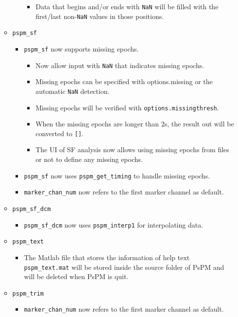 \documentclass[english]{article}
\numberwithin{equation}{section}
\numberwithin{figure}{section}
\begin{document}
\begin{itemize}
\begin{itemize}
\begin{itemize}
    		\begin{itemize}
    		\item Data that begins and/or ends with \texttt{NaN} will be filled with the first/last non-\texttt{NaN} values in those positions.
    		\end{itemize}
    	\end{itemize}
    	\item \texttt{pspm\_sf}
    	\begin{itemize}
    		\item \texttt{pspm\_sf} now supports missing epochs.
    		\begin{itemize}
    			\item Now allow input with \texttt{NaN} that indicates missing epochs. 
    			\item Missing epochs can be specified with options.missing or the automatic \texttt{NaN} detection. 
    			\item Missing epochs will be verified with \texttt{options.missingthresh}. 
    			\item When the missing epochs are longer than 2s, the result out will be converted to \texttt{[]}.
    			\item The UI of SF analysis now allows using missing epochs from files or not to define any missing epochs.
    		\end{itemize}
    		\item \texttt{pspm\_sf} now uses \texttt{pspm\_get\_timing} to handle missing epochs.
    		\item \texttt{marker\_chan\_num} now refers to the first marker channel as default.
    	\end{itemize}
    	\item \texttt{pspm\_sf\_dcm}
    	\begin{itemize}
    		\item \texttt{pspm\_sf\_dcm} now uses \texttt{pspm\_interp1} for interpolating data.
    	\end{itemize}
    	\item \texttt{pspm\_text}
    	\begin{itemize}
    		\item The Matlab file that stores the information of help text \texttt{pspm\_text.mat} will be stored inside the source folder of PsPM and will be deleted when PsPM is quit.
    	\end{itemize}
    	\item \texttt{pspm\_trim}
    	\begin{itemize}
    		\item \texttt{marker\_chan\_num} now refers to the first marker channel as default.
    	\end{itemize}
    \end{itemize}
    

\end{itemize}
\end{document}
